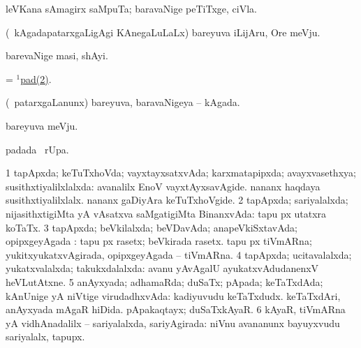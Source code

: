 \begin{center}
\bentry
{} 
\gl{\nA}
\expl{}
\bmng
leVKana sAmagirx saMpuTa; baravaNige peTiTxge, ciVla. 
\emng
\eentry

\bentry
{} 
\gl{\nA}
\expl{}
\bmng
(\kanmu\ kAgadapatarxgaLigAgi KAnegaLuLaLx) bareyuva iLijAru, Ore meVju. 
\emng
\eentry

\bentry
{} 
\gl{\nA}
\expl{}
\bmng
barevaNige masi, shAyi. 
\emng
\eentry

\bentry
{} 
\gl{\nA}
\expl{}
\bmng
= \hyperref{kandict_p.pdf}{P}{pad(1)2}{$^1$pad(2)}. 
\emng
\eentry

\bentry
{} 
\gl{\nA}
\expl{}
\bmng
(\kanmu\ patarxgaLanunx) bareyuva, baravaNigeya -- kAgada. 
\emng
\eentry

\bentry
{} 
\gl{\nA}
\expl{}
\bmng
bareyuva meVju. 
\emng
\eentry

\bentry
{} 
\gl{\kirx}
\expl{}
\bmng
{} padada \BUkaq\ rUpa. 
\emng
\eentry

\bentry
{} 
\gl{\saMkiSx}
\expl{}
\bmng
{} 
\emng
\eentry

\bentry
{} 
\gl{\gu}
\expl{}
\bmng
\bnum
\num{1} tapApxda; keTuTxhoVda; vayxtayxsatxvAda; karxmatapipxda; avayxvasethxya; susithxtiyalilxlalxda:  avanalilx EnoV vayxtAyxsavAgide.  nananx haqdaya susithxtiyalilxlalx.  nananx gaDiyAra keTuTxhoVgide. 
\num{2} tapApxda; sariyalalxda; nijasithxtigiMta yA vAsatxva saMgatigiMta BinanxvAda:  tapu px utatxra koTaTx. 
\num{3} tapApxda; beVkilalxda; beVDavAda; anapeVkiSxtavAda; opipxgeyAgada :  tapu px rasetx; beVkirada rasetx.  tapu px tiVmARna; yukitxyukatxvAgirada, opipxgeyAgada -- tiVmARna. 
\num{4} tapApxda; ucitavalalxda; yukatxvalalxda; takukxdalalxda:  avanu yAvAgalU ayukatxvAdudanenxV heVLutAtxne. 
\num{5} anAyxyada; adhamaRda; duSaTx; pApada; keTaTxdAda; kAnUnige yA niVtige virudadhxvAda:  kadiyuvudu keTaTxdudx.  keTaTxdAri, anAyxyada mAgaR hiDida.  pApakaqtayx; duSaTxkAyaR. 
\num{6} kAyaR, tiVmARna yA vidhAnadalilx -- sariyalalxda, sariyAgirada:  niVnu avananunx bayuyxvudu sariyalalx, tapupx. 
\enum
\emng


\end{center}
